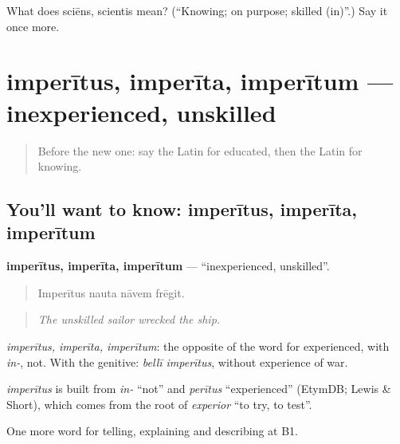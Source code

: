 \begin{tcolorbox}[breakable,colback=teal!4,colframe=teal!35!black,title={Before you move on}]
What does sciēns, scientis mean? (\textquotedblleft{}Knowing; on purpose; skilled (in)\textquotedblright{}.) Say it once more.
\end{tcolorbox}
\section[imperītus, imperīta, imperītum]{imperītus, imperīta, imperītum — inexperienced, unskilled}

\label{lesson:LA-C403-imperitus}



\begin{quote}
Before the new one: say the Latin for educated, then the Latin for knowing.
\end{quote}

\subsection*{You'll want to know: imperītus, imperīta, imperītum}
\textbf{imperītus, imperīta, imperītum} — \textquotedblleft{}inexperienced, unskilled\textquotedblright{}.

\begin{quote}
Imperītus nauta nāvem frēgit.
\end{quote}

\begin{quote}
\emph{The unskilled sailor wrecked the ship.}
\end{quote}

\emph{imperītus, imperīta, imperītum}: the opposite of the word for experienced, with \emph{in-}, not. With the genitive: \emph{bellī imperītus}, without experience of war.

\begin{cousinweb}
\emph{imperītus} is built from \emph{in-} \textquotedblleft{}not\textquotedblright{} and \emph{perītus} \textquotedblleft{}experienced\textquotedblright{} (EtymDB; Lewis \& Short), which comes from the root of \emph{experior} \textquotedblleft{}to try, to test\textquotedblright{}.
\end{cousinweb}

\begin{grammarlens}[title={What you've built}]
One more word for telling, explaining and describing at B1.
\end{grammarlens}

